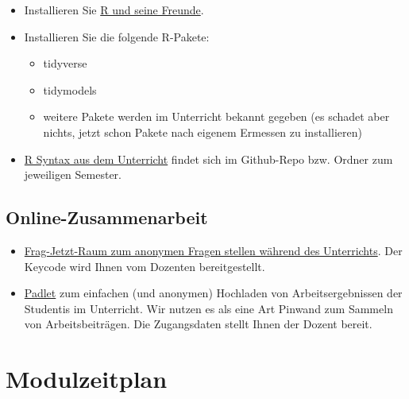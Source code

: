\documentclass[
]{book}
\providecommand{\tightlist}{%
  \setlength{\itemsep}{0pt}\setlength{\parskip}{0pt}}
\begin{document}
\begin{itemize}
\tightlist
\item
  Installieren Sie \href{https://data-se.netlify.app/2021/11/30/installation-von-r-und-seiner-freunde/}{R und seine Freunde}.
\item
  Installieren Sie die folgende R-Pakete:

  \begin{itemize}
  \tightlist
  \item
    tidyverse
  \item
    tidymodels
  \item
    weitere Pakete werden im Unterricht bekannt gegeben (es schadet aber nichts, jetzt schon Pakete nach eigenem Ermessen zu installieren)
  \end{itemize}
\item
  \href{https://github.com/sebastiansauer/Lehre}{R Syntax aus dem Unterricht} findet sich im Github-Repo bzw. Ordner zum jeweiligen Semester.
\end{itemize}

\hypertarget{online-zusammenarbeit}{%
\subsection{Online-Zusammenarbeit}\label{online-zusammenarbeit}}

\begin{itemize}
\tightlist
\item
  \href{https://frag.jetzt/home}{Frag-Jetzt-Raum zum anonymen Fragen stellen während des Unterrichts}. Der Keycode wird Ihnen vom Dozenten bereitgestellt.
\item
  \href{https://de.padlet.com/}{Padlet} zum einfachen (und anonymen) Hochladen von Arbeitsergebnissen der Studentis im Unterricht. Wir nutzen es als eine Art Pinwand zum Sammeln von Arbeitsbeiträgen. Die Zugangsdaten stellt Ihnen der Dozent bereit.
\end{itemize}

\hypertarget{modulzeitplan}{%
\section{Modulzeitplan}\label{modulzeitplan}}
\end{document}
